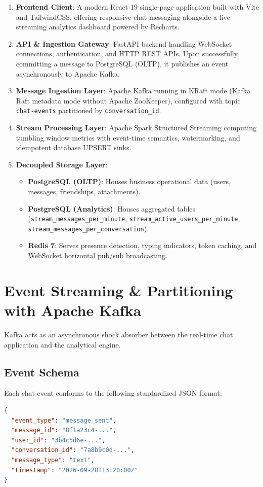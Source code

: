 \documentclass[11pt,a4paper]{article}
\begin{document}
\begin{enumerate}
    \item \textbf{Frontend Client}: A modern React 19 single-page application built with Vite and TailwindCSS, offering responsive chat messaging alongside a live streaming analytics dashboard powered by Recharts.
    \item \textbf{API \& Ingestion Gateway}: FastAPI backend handling WebSocket connections, authentication, and HTTP REST APIs. Upon successfully committing a message to PostgreSQL (OLTP), it publishes an event asynchronously to Apache Kafka.
    \item \textbf{Message Ingestion Layer}: Apache Kafka running in KRaft mode (Kafka Raft metadata mode without Apache ZooKeeper), configured with topic \texttt{chat-events} partitioned by \texttt{conversation\_id}.
    \item \textbf{Stream Processing Layer}: Apache Spark Structured Streaming computing tumbling window metrics with event-time semantics, watermarking, and idempotent database UPSERT sinks.
    \item \textbf{Decoupled Storage Layer}:
    \begin{itemize}
        \item \textbf{PostgreSQL (OLTP)}: Houses business operational data (users, messages, friendships, attachments).
        \item \textbf{PostgreSQL (Analytics)}: Houses aggregated tables (\texttt{stream\_messages\_per\_minute}, \texttt{stream\_active\_users\_per\_minute}, \texttt{stream\_messages\_per\_conversation}).
        \item \textbf{Redis 7}: Serves presence detection, typing indicators, token caching, and WebSocket horizontal pub/sub broadcasting.
    \end{itemize}
\end{enumerate}

\section{Event Streaming \& Partitioning with Apache Kafka}
Kafka acts as an asynchronous shock absorber between the real-time chat application and the analytical engine.

\subsection{Event Schema}
Each chat event conforms to the following standardized JSON format:
\begin{lstlisting}[language=json]
{
  "event_type": "message_sent",
  "message_id": "8f1a23c4-...",
  "user_id": "3b4c5d6e-...",
  "conversation_id": "7a8b9c0d-...",
  "message_type": "text",
  "timestamp": "2026-09-28T13:20:00Z"
}
\end{lstlisting}
\end{document}
